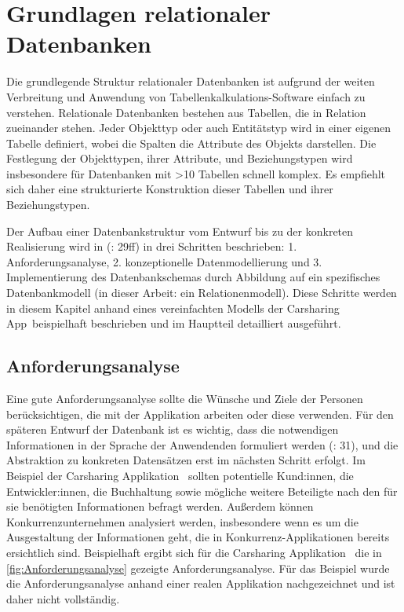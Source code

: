 \section{Grundlagen relationaler Datenbanken}
\label{section:basics}

Die grundlegende Struktur relationaler Datenbanken ist aufgrund der weiten Verbreitung und Anwendung von Tabellenkalkulations-Software einfach zu verstehen. Relationale Datenbanken bestehen aus Tabellen, die in Relation zueinander stehen. Jeder Objekttyp oder auch Entitätstyp wird in einer eigenen Tabelle definiert, wobei die Spalten die Attribute des Objekts darstellen. Die Festlegung der Objekttypen, ihrer Attribute, und Beziehungstypen wird insbesondere für Datenbanken mit >10 Tabellen schnell komplex. Es empfiehlt sich daher eine strukturierte  Konstruktion dieser Tabellen und ihrer Beziehungstypen. 

Der Aufbau einer Datenbankstruktur vom Entwurf bis zu der konkreten Realisierung wird in (\cite{kaufmannSQLNoSQLDatenbanken92023}: 29ff) in drei Schritten beschrieben: 1. Anforderungsanalyse, 2. konzeptionelle Datenmodellierung und 3. Implementierung des Datenbankschemas durch Abbildung auf ein spezifisches Datenbankmodell (in dieser Arbeit: ein Relationenmodell). Diese Schritte werden in diesem Kapitel anhand eines vereinfachten Modells der \glqq Carsharing App\grqq\ beispielhaft beschrieben und im Hauptteil detailliert ausgeführt.

\subsection{Anforderungsanalyse}
Eine gute Anforderungsanalyse sollte die Wünsche und Ziele der Personen berücksichtigen, die mit der Applikation arbeiten oder diese verwenden. Für den späteren Entwurf der Datenbank ist es wichtig, dass die notwendigen Informationen in der Sprache der Anwendenden formuliert werden (\cite{kaufmannSQLNoSQLDatenbanken92023}: 31), und die Abstraktion zu konkreten Datensätzen erst im nächsten Schritt erfolgt. Im Beispiel der \glqq Carsharing Applikation \grqq\ sollten potentielle Kund:innen, die Entwickler:innen, die Buchhaltung sowie mögliche weitere Beteiligte nach den für sie benötigten Informationen befragt werden. Au\ss erdem können Konkurrenzunternehmen analysiert werden, insbesondere wenn es um die Ausgestaltung der Informationen geht, die in Konkurrenz-Applikationen bereits ersichtlich sind. Beispielhaft ergibt sich für die \glqq Carsharing Applikation \grqq\ die in \autoref{fig:Anforderungsanalyse} gezeigte Anforderungsanalyse. Für das Beispiel wurde die Anforderungsanalyse anhand einer realen Applikation nachgezeichnet und ist daher nicht vollständig.

